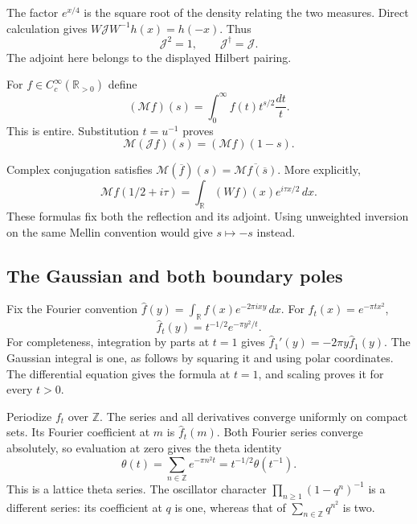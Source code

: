The factor $e^{x/4}$ is the square
root of the density relating the
two measures.
Direct calculation gives
$W\mathcal JW^{-1}h(x)=h(-x)$.
Thus
\begin{equation}\label{v4-arith:md:eq:mellin-adjoint}
 \mathcal J^2=1,\qquad
 \mathcal J^\dagger=\mathcal J.
\end{equation}
The adjoint here belongs to the
displayed Hilbert pairing.

For $f\in C_c^\infty(\mathbb R_{>0})$
define
\[
 (\mathcal Mf)(s)=
       \int_0^\infty f(t)t^{s/2}\frac{dt}{t}.
\]
This is entire. Substitution
$t=u^{-1}$ proves
\begin{equation}\label{v4-arith:md:eq:mellin-square}
 \mathcal M(\mathcal Jf)(s)
       =(\mathcal Mf)(1-s).
\end{equation}

Complex conjugation satisfies
$\mathcal M(\overline f)(s)
=\overline{\mathcal Mf(\overline s)}$.
More explicitly,
\[
 \mathcal Mf(1/2+i\tau)
     =\int_{\mathbb R}(Wf)(x)e^{i\tau x/2}\,dx.
\]
These formulas fix both the
reflection and its adjoint.
Using unweighted inversion on the
same Mellin convention would give
$s\mapsto-s$ instead.

\subsection{The Gaussian and both boundary poles}

Fix the Fourier convention
$\widehat f(y)=\int_{\mathbb R}
f(x)e^{-2\pi ixy}\,dx$.
For $f_t(x)=e^{-\pi tx^2}$,
\[
 \widehat f_t(y)=t^{-1/2}e^{-\pi y^2/t}.
\]
For completeness, integration by
parts at $t=1$ gives
$\widehat f_1'(y)=-2\pi y\widehat f_1(y)$.
The Gaussian integral is one,
as follows by squaring it and
using polar coordinates.
The differential equation gives
the formula at $t=1$, and scaling
proves it for every $t>0$.

Periodize $f_t$ over $\mathbb Z$.
The series and all derivatives
converge uniformly on compact
sets. Its Fourier coefficient at
$m$ is $\widehat f_t(m)$.
Both Fourier series converge
absolutely, so evaluation at zero
gives the theta identity
\[
 \theta(t)=\sum_{n\in\mathbb Z}e^{-\pi n^2t}
       =t^{-1/2}\theta(t^{-1}).
\]
This is a lattice theta series.
The oscillator character
$\prod_{n\geq1}(1-q^n)^{-1}$
is a different series: its
coefficient at $q$ is one,
whereas that of
$\sum_{n\in\mathbb Z}q^{n^2}$
is two.


